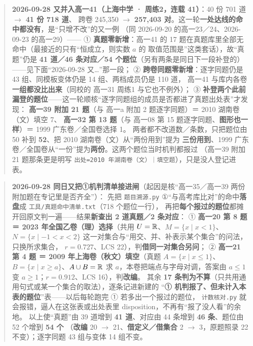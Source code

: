 \documentclass[a4paper,11pt]{article}
\begin{document}
\begin{quote}
\textbf{2026-09-28 又并入高一41（上海中学 · 周练2，连载 41）}：40 份 701 道 $\to$ \textbf{41 份 718 道}、
跨卷 245,350 $\to$ \textbf{257,403 对}。这一轮\textbf{一处达线的命中都没有}，是``只增不改''的又一例
（同 2026-09-20 的高一23／24、2026-09-23 的高一29）------
① \textbf{真题零新增}：高一41 的 17 题在真题库里全部无命中（最接近的只有``恒成立，则实数 \(a\) 的
取值范围是''这类套话），故``真题''仍是 \textbf{41 道／46 条对应／54 个题位}（另有两条是同日下一段补登的）
------见下面``2026-09-28 又\ldots''那一段；
② \textbf{跨卷同题零新增}：逐字同题仍是 43 组、同模板变体仍是 14 组、两档成员仍是 110 道，
高一41 与库内各卷\textbf{一组都没比出来}（同校的 高一31 周练1 与它也不例外）；
③ \textbf{补登两个此前漏登的题位}------这一轮顺核``逐字同题组的成员是否都进了真题出处表''才发现：
\textbf{高一39 附加 21 题}（与 高一a 附加 2 题逐字同题）＝ 2010 湖南卷（文）填空 7、
\textbf{高一32 第 13 题}（与 高一08 第 15 题逐字同题、\textbf{图形也一样}）＝ 1999 广东卷／全国卷选择 1。
两者都不改道数／条数，只把题位由 50 补到 \textbf{52}、把 2010 湖南卷（文）从``两份用到''提为
\textbf{三份用到}、1999 广东卷／全国卷从``一份''提为\textbf{两份}。这两个题位当时机判都报过
（高一39 附加 21 题那条更是明写 \texttt{出处=2010\ 年湖南卷（文）｜填空题}），只是没人登记进表。
\end{quote}

\begin{quote}
\textbf{2026-09-28 同日又把①机判清单接进闸}（起因是核``高一35／高一39 两份附加题在专记里是否齐全''）：
先把 \texttt{题目溯源.py} ①``与高考库比对''的命中\textbf{落盘}成 \texttt{工具/\allowbreak{}真题命中清单.txt}（718 个题位一行），
再把\textbf{每个报过的题位}都摊开回原文判一遍------结果\textbf{新查出 2 道真题／2 条对应}：
① \textbf{高一20 第 8 题 ＝ 2023 年全国乙卷（理）选择}（共用 \(U=\mathbb{R}\)、\(M=\{x\mid x<1\}\)、
\(N=\{x\mid-1<x<2\}\) 这一对集合与``用交、并、补表示某个集合''的问法，只换所求集合，
\(r=0.727\)、LCS 22），判\textbf{借同一对集合另问}；
② \textbf{高一21 第 4 题 ＝ 2009 年上海卷（秋文）填空}（真题 \(A=\{x\mid x\leqslant1\}\)、
\(B=\{x\mid x\geqslant a\}\)、\(A\cup B=\mathbb{R}\) 求 \(a\)，本卷把端点与字母对调，答案由 \(a\leqslant1\)
变 \(a\geqslant1\)；\(r=0.912\)、LCS 16），判\textbf{改编}。
其余 \textbf{17 条判为不算}（只共用通用句式或某一个集合的取法），逐条记进新建的
``\textbf{① 机判报了、但未计入本表的题位}''表------以后每轮跑完 ① 若多出一个报过的题位，
\texttt{计数核对.py} 就会报错，逼人在这张表或出处表里 disposition，不再有``报了没人看''的余地。
以上使``真题''由 39 道增到 \textbf{41 道}、对应由 44 条增到 \textbf{46 条}、题位由 52 个增到 \textbf{54 个}
（\textbf{改编} 20 $\to$ 21、\textbf{借定义／借集合} 2 $\to$ 3，原题照录 22 不变）；逐字同题 43 组与变体 14 组不变。
\end{quote}
\end{document}
